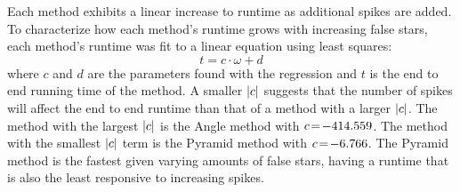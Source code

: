 \documentclass[conference]{IEEEtran}
\begin{document}
    Each method exhibits a linear increase to runtime as additional spikes are added.
    To characterize how each method's runtime grows with increasing false stars, each method's runtime was fit to a linear
    equation using least squares:
    \begin{equation}
        t = c\cdot\omega + d
    \end{equation}
    where $c$ and $d$ are the parameters found with the regression and $t$ is the end to end running time of the method.
    A smaller $\left| c \right|$ suggests that the number of spikes will affect the end to end runtime than that of a method with a
    larger $\left| c \right|$.
    The method with the largest $\left| c \right|$ is the Angle method with $c \!=\! -414.559$.
    The method with the smallest $\left| c \right|$ term is the Pyramid method with $c \!=\! -6.766$.
    The Pyramid method is the fastest given varying amounts of false stars, having a runtime that is also the least
    responsive to increasing spikes.
\end{document}

